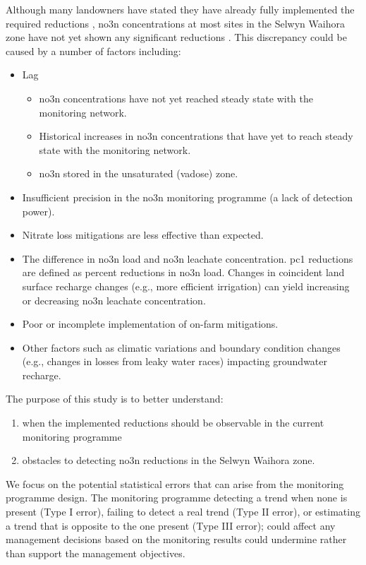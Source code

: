 Although many landowners have stated they have already fully implemented the required reductions \citep{scottpc}, \gls{no3n} concentrations at most sites in the Selwyn Waihora zone have not yet shown any significant reductions \citep{scottpc}.
This discrepancy could be caused by a number of factors including:
\begin{itemize}
    \item Lag
    \begin{itemize}
        \item \gls{no3n} concentrations have not yet reached steady state with the monitoring network.
        \item Historical increases in \gls{no3n} concentrations that have yet to reach steady state with the monitoring network.
        \item \gls{no3n} stored in the unsaturated (vadose) zone.
    \end{itemize}
    \item Insufficient precision in the \gls{no3n} monitoring programme (a lack of detection power).
    \item Nitrate loss mitigations are less effective than expected.
    \item The difference in \gls{no3n} load and \gls{no3n} leachate concentration. \gls{pc1} reductions are defined as percent reductions in \gls{no3n} load. Changes in coincident land surface recharge changes (e.g., more efficient irrigation) can yield increasing or decreasing \gls{no3n} leachate concentration.
    \item Poor or incomplete implementation of on-farm mitigations.
    \item Other factors such as climatic variations and boundary condition changes (e.g., changes in losses from leaky water races) impacting groundwater recharge.
\end{itemize}

The purpose of this study is to better understand:
\begin{enumerate}
    \item when the implemented reductions should be observable in the current monitoring programme
    \item obstacles to detecting \gls{no3n} reductions in the Selwyn Waihora zone.
\end{enumerate}

We focus on the potential statistical errors that can arise from the monitoring programme design.
The monitoring programme detecting a trend when none is present (Type I error), failing to detect a real trend (Type II error), or estimating a trend that is opposite to the one present (Type III error); could affect any management decisions based on the monitoring results could undermine rather than support the management objectives.
